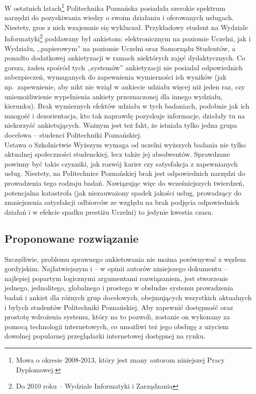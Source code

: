 W ostatnich latach\footnote{Mowa o okresie 2008-2013, który jest znany autorom niniejszej Pracy Dyplomowej.} Politechnika Poznańska posiadała szerokie spektrum narzędzi do pozyskiwania wiedzy o swoim działaniu i oferowanych usługach. Niestety, gros z nich wzajemnie się wykluczał. Przykładowy student na Wydziale Informatyki\footnote{Do 2010 roku -- Wydziale Informatyki i Zarządzania} poddawany był ankietom: elektronicznym na poziomie Uczelni, jak i Wydziału, ,,papierowym'' na poziomie Uczelni oraz Samorządu Studentów, a ponadto dodatkowej ankietyzacji w ramach niektórych zajęć dydaktycznych. Co gorsza, żaden spośród tych ,,systemów'' ankietyzacji nie posiadał odpowiednich zabezpieczeń, wymaganych do zapewnienia wymierności ich wyników (jak np.~zapewnienie, aby nikt nie wziął w ankiecie udziału więcej niż jeden raz, czy uniemożliwienie wypełnienia ankiety przeznaczonej dla innego wydziału, kierunku). Brak wymiernych efektów udziału w tych badaniach, podobnie jak ich mnogość i dezorientacja, kto tak naprawdę pozyskuje informacje, działały tu na niekorzyść ankietujących. Ważnym jest też fakt, że istniała tylko jedna grupa docelowa -- studenci Politechniki Poznańskiej. \\

Ustawa o Szkolnictwie Wyższym wymaga od uczelni wyższych badania nie tylko aktualnej społeczności studenckiej, lecz także jej absolwentów. Sprawdzane powinny być takie czynniki, jak rozwój karier czy satysfakcja z zapewnianych usług. Niestety, na Politechnice Poznańskiej brak jest odpowiednich narzędzi do prowadzenia tego rodzaju badań. Nawiązując więc do wcześniejszych twierdzeń, potencjalna katastrofa (jak niezauważony spadek jakości usług, prowadzący do zmniejszenia satysfakcji odbiorców ze względu na brak podjęcia odpowiednich działań i w efekcie spadku prestiżu Uczelni) to jedynie kwestia czasu. \\

\subsection{Proponowane rozwiązanie}
\label{Chapter112}

Szczęśliwie, problemu sprawnego ankietowania nie można porównywać z węzłem gordyjskim. Najłatwiejszym i -- w opinii autorów niniejszego dokumentu -- najlepiej popartym logicznymi argumentami rozwiązaniem, jest stworzenie jednego, jednolitego, globalnego i prostego w obsłudze systemu prowadzenia badań i ankiet dla różnych grup docelowych, obejmujących wszystkich aktualnych i byłych studentów Politechniki Poznańskiej. Aby zapewnić dostępność oraz prostotę wdrożenia systemu, który na to pozwoli, zostanie on wykonany za pomocą technologii internetowych, co umożliwi też jego obsługę z użyciem dowolnej popularnej przeglądarki internetowej dostępnej na rynku. \\

